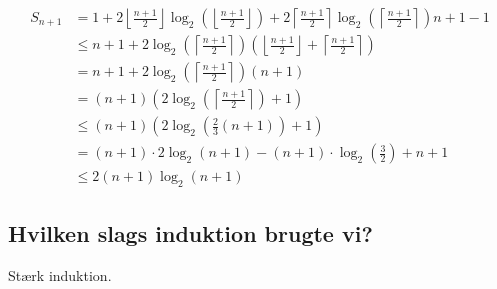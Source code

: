 \begin{equation}
    \begin{aligned}
        S_{n + 1} & = 1 + 2 \left\lfloor \frac{n + 1}{2} \right\rfloor \log_2\left( \left\lfloor \frac{n + 1}{2}
        \right\rfloor \right) + 2 \left\lceil \frac{n + 1}{2} \right\rceil \log_2\left( \left\lceil \frac{n + 1}{2}
        \right\rceil \right) n + 1 - 1                                                                                        \\
                  & \leq n + 1 + 2 \log_2\left( \left\lceil \frac{n + 1}{2} \right\rceil \right)\left( \left\lfloor \frac{n +
        1}{2} \right\rfloor + \left\lceil \frac{n + 1}{2} \right\rceil \right)                                                \\
                  & = n + 1 + 2\log_2\left( \left\lceil \frac{n + 1}{2} \right\rceil \right)(n + 1)                           \\
                  & = (n + 1) \left(2\log_2\left( \left\lceil \frac{n + 1}{2} \right\rceil \right) + 1 \right)                \\
                  & \leq (n + 1) \left( 2\log_2\left( \frac{2}{3}(n + 1) \right) + 1 \right)                                  \\
                  & = (n + 1) \cdot 2 \log_2(n + 1) - (n + 1) \cdot \log_2\left( \frac{3}{2} \right) + n + 1                  \\
                  & \leq 2(n + 1) \log_2(n + 1)
    \end{aligned}
    \label{eq:equation22}
\end{equation}

\subsection{Hvilken slags induktion brugte vi?}\label{subsec:hvilken-slags-induktion-brugte-vi?}

Stærk induktion.

